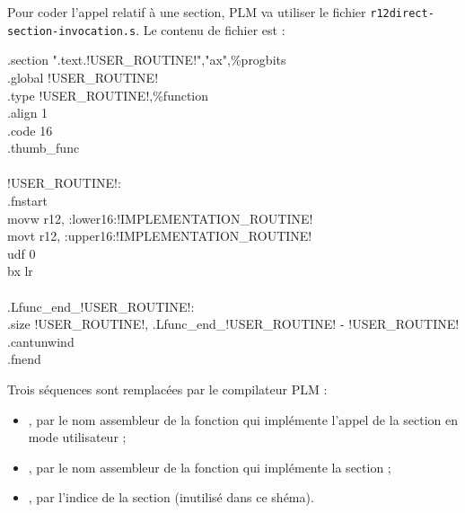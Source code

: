 Pour coder l'appel relatif à une section, PLM va utiliser le fichier \texttt{r12direct-section-invocation.s}. Le contenu de fichier est :
\begin{SHELL}\small
\hspace*{1.2em}.section  ".text.!USER\_ROUTINE!","ax",\%progbits\\
\hspace*{1.2em}.global !USER\_ROUTINE!\\
\hspace*{1.2em}.type  !USER\_ROUTINE!,\%function\\
\hspace*{1.2em}.align  1\\
\hspace*{1.2em}.code  16\\
\hspace*{1.2em}.thumb\_func\\
\\
!USER\_ROUTINE!:\\
\hspace*{1.2em}.fnstart\\
\hspace*{1.2em}movw  r12, :lower16:!IMPLEMENTATION\_ROUTINE!\\
\hspace*{1.2em}movt  r12, :upper16:!IMPLEMENTATION\_ROUTINE!\\
\hspace*{1.2em}udf 0\\
\hspace*{1.2em}bx  lr\\
\\
.Lfunc\_end\_!USER\_ROUTINE!:\\
\hspace*{1.2em}.size  !USER\_ROUTINE!, .Lfunc\_end\_!USER\_ROUTINE! - !USER\_ROUTINE!\\
\hspace*{1.2em}.cantunwind\\
\hspace*{1.2em}.fnend
\end{SHELL}

Trois séquences sont remplacées par le compilateur PLM :
\begin{itemize}
\item {}, par le nom assembleur de la fonction qui implémente l'appel de la section en mode utilisateur ;
\item {}, par le nom assembleur de la fonction qui implémente la section ;
\item {}, par l'indice de la section (inutilisé dans ce shéma).
\end{itemize}

